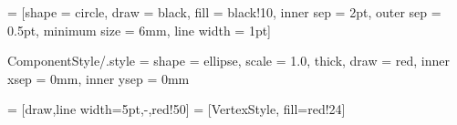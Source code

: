 \usepackage{tikz}


\usepackage{tkz-graph}
\usetikzlibrary{arrows}
\usetikzlibrary{fit}
\usetikzlibrary{shapes,fit}
  = [shape = circle,
							draw = black, %
							fill = black!10,
							inner sep = 2pt,
							outer sep = 0.5pt,
							minimum size = 6mm,
							line width = 1pt]
 \SetUpEdge[lw         = 1pt,
            color      = black,
            labelstyle = {sloped, text=black, fill=white}]


\tikzset
{
	ComponentStyle/.style =
	{
		shape = ellipse,							%
		scale			= 1.0,					%
		thick,									%
		draw			= red,				%
		inner xsep		= 0mm,					%
		inner ysep		= 0mm					%
	}
}


 = [draw,line width=5pt,-,red!50]
 = [VertexStyle, fill=red!24]

\usepackage{listings}

\usepackage{algorithm}
\usepackage{algorithmic}


\usepackage{alltt}
\newenvironment{myindentpar}[1]%
{\begin{list}{}%
         {\setlength{\leftmargin}{#1}}%
         \item[]%
}
{\end{list}}
